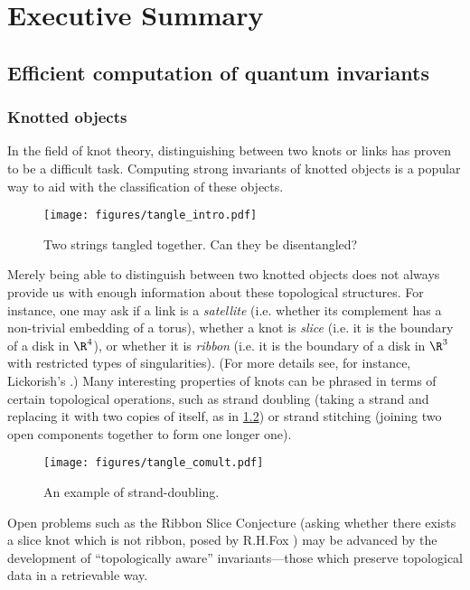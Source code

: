 \chapter{Executive Summary}
\label{ch:summary}

\section{Efficient computation of quantum invariants}
\subsection{Knotted objects}
In the field of knot theory, distinguishing between two knots or links
has proven to be a difficult task. Computing strong invariants of knotted
objects is a popular way to aid with the classification of these objects.
\begin{figure}[h]
        \centering
        \texttt{[image: figures/tangle\_intro.pdf]}
        \caption{Two strings tangled together. Can they be disentangled?}
        \label{fig:unknot}
\end{figure}

Merely being able to distinguish between two knotted objects does not always
provide us with enough information about these topological structures. For
instance, one may ask if a link is a \emph{satellite} (i.e. whether its
complement has a non-trivial embedding of a torus), whether a knot is
\emph{slice} (i.e. it is the boundary of a disk in $\R^4$), or whether it is
\emph{ribbon} (i.e. it is the boundary of a disk in $\R^3$ with restricted types
of singularities). (For more details see, for instance, Lickorish's
\cite{lickorish}.) Many interesting properties of knots can be phrased in terms
of certain topological operations, such as strand doubling (taking a strand and
replacing it with two copies of itself, as in \cref{fig:strand_double}) or
strand stitching (joining two open components together to form one longer one).

\begin{figure}[h]
        \centering
        \texttt{[image: figures/tangle\_comult.pdf]}
        \caption{An example of strand-doubling.}
        \label{fig:strand_double}
\end{figure}

Open problems such as the Ribbon Slice Conjecture (asking whether there exists a
slice knot which is not ribbon, posed by R.\@ H.\@ Fox \cite{fox}) may be
advanced by the development of \enquote{topologically aware} invariants---those
which preserve topological data in a retrievable way.

